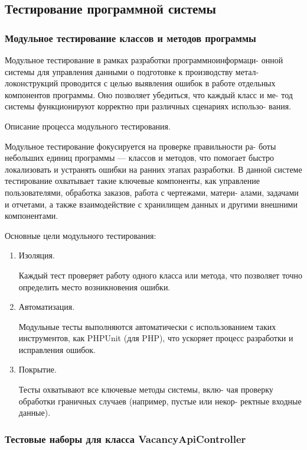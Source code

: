 \subsection{Тестирование программной системы}

\subsubsection{Модульное тестирование классов и методов программы}

Модульное тестирование в рамках разработки программноинформаци-
онной системы для управления данными о подготовке к производству метал-
локонструкций проводится с целью выявления ошибок в работе отдельных
компонентов программы. Оно позволяет убедиться, что каждый класс и ме-
тод системы функционируют корректно при различных сценариях использо-
вания.

Описание процесса модульного тестирования.

Модульное тестирование фокусируется на проверке правильности ра-
боты небольших единиц программы — классов и методов, что помогает
быстро локализовать и устранять ошибки на ранних этапах разработки. В
данной системе тестирование охватывает такие ключевые компоненты, как
управление пользователями, обработка заказов, работа с чертежами, матери-
алами, задачами и отчетами, а также взаимодействие с хранилищем данных
и другими внешними компонентами.

Основные цели модульного тестирования:
\begin{enumerate}
	\item Изоляция. 
	
	Каждый тест проверяет работу одного класса или метода,
	что позволяет точно определить место возникновения ошибки.
	
	\item Автоматизация. 
	
	Модульные тесты выполняются автоматически с
	использованием таких инструментов, как PHPUnit (для PHP), что ускоряет
	процесс разработки и исправления ошибок.
	
	\item Покрытие. 
	
	Тесты охватывают все ключевые методы системы, вклю-
	чая проверку обработки граничных случаев (например, пустые или некор-
	ректные входные данные).
	
\end{enumerate}


\subsubsection{Тестовые наборы для класса VacancyApiController}

